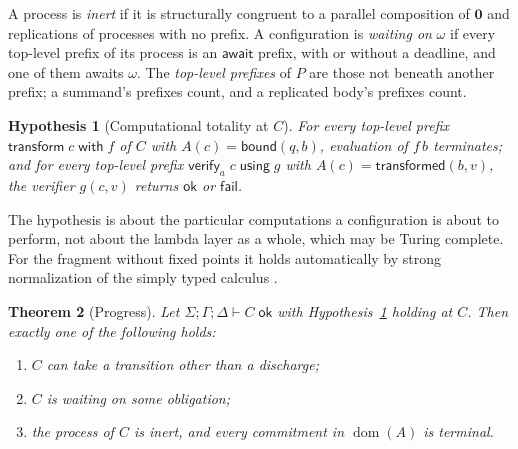 \documentclass[11pt,openany]{book}
\newtheorem{theorem}{Theorem}[chapter]
\newtheorem{hypothesis}[theorem]{Hypothesis}
\theoremstyle{remark}
\newcommand{\dom}{\operatorname{dom}}
\begin{document}
A process is \emph{inert} if it is structurally congruent to a parallel
composition of $\mathbf 0$ and replications of processes with no prefix.
A configuration is \emph{waiting on} $\omega$ if every top-level prefix of
its process is an $\mathsf{await}$ prefix, with or without a deadline, and
one of them awaits $\omega$.
The \emph{top-level prefixes} of $P$ are those not beneath another
prefix; a summand's prefixes count, and a replicated body's prefixes
count.

\begin{hypothesis}[Computational totality at $C$]\label{hyp:total}
For every top-level prefix $\mathsf{transform}\;c\;\mathsf{with}\;f$ of
$C$ with $A(c)=\mathsf{bound}(q,b)$, evaluation of $f\,b$ terminates; and
for every top-level prefix $\mathsf{verify}_a\;c\;\mathsf{using}\;g$ with
$A(c)=\mathsf{transformed}(b,v)$, the verifier $g(c,v)$ returns
$\mathsf{ok}$ or $\mathsf{fail}$.
\end{hypothesis}

The hypothesis is about the particular computations a configuration is
about to perform, not about the lambda layer as a whole, which may be
Turing complete. For the fragment without fixed points it holds
automatically by strong normalization of the simply typed calculus
\cite{tait}.

\begin{theorem}[Progress]\label{thm:progress}
Let $\Sigma;\Gamma;\Delta\vdash C\;\mathsf{ok}$ with
Hypothesis~\ref{hyp:total} holding at $C$. Then exactly one of the
following holds:
\begin{enumerate}[label=(\roman*)]
\item $C$ can take a transition other than a discharge;
\item $C$ is waiting on some obligation;
\item the process of $C$ is inert, and every commitment in $\dom(A)$ is
terminal.
\end{enumerate}
\end{theorem}
\end{document}
